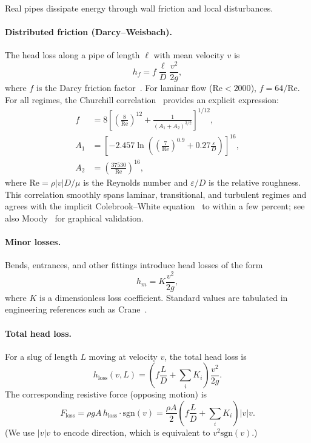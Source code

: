 \documentclass[11pt]{article}
\theoremstyle{definition}
\begin{document}
Real pipes dissipate energy through wall friction and local disturbances.

\paragraph{Distributed friction (Darcy--Weisbach).}
The head loss along a pipe of length $\ell$ with mean velocity $v$ is
\[
  h_f = f \frac{\ell}{D} \frac{v^2}{2g},
\]
where $f$ is the Darcy friction factor~\cite{white}. For laminar flow ($\text{Re} < 2000$), 
$f = 64/\text{Re}$. For all regimes, the Churchill correlation~\cite{churchill} provides 
an explicit expression:
\begin{align}
  f &= 8\left[\left(\frac{8}{\text{Re}}\right)^{12} 
       + \frac{1}{(A_1 + A_2)^{3/2}}\right]^{1/12}, \label{eq:churchill-f} \\
  A_1 &= \left[-2.457 \ln\left(\left(\frac{7}{\text{Re}}\right)^{0.9} 
         + 0.27\frac{\varepsilon}{D}\right)\right]^{16}, \label{eq:churchill-A1} \\
  A_2 &= \left(\frac{37530}{\text{Re}}\right)^{16}, \label{eq:churchill-A2}
\end{align}
where $\text{Re} = \rho |v| D / \mu$ is the Reynolds number and $\varepsilon/D$ is the 
relative roughness. This correlation smoothly spans laminar, transitional, and turbulent 
regimes and agrees with the implicit Colebrook--White equation~\cite{colebrook} to within 
a few percent; see also Moody~\cite{moody} for graphical validation.

\paragraph{Minor losses.}
Bends, entrances, and other fittings introduce head losses of the form
\[
  h_m = K \frac{v^2}{2g},
\]
where $K$ is a dimensionless loss coefficient. Standard values are tabulated in engineering 
references such as Crane~\cite{crane}.

\paragraph{Total head loss.}
For a slug of length $L$ moving at velocity $v$, the total head loss is
\begin{equation}
  h_{\text{loss}}(v, L) = \left(f \frac{L}{D} + \sum_i K_i\right) \frac{v^2}{2g}.
  \label{eq:hloss}
\end{equation}
The corresponding resistive force (opposing motion) is
\[
  F_{\text{loss}} = \rho g A\, h_{\text{loss}} \cdot \text{sgn}(v) 
                  = \frac{\rho A}{2}\left(f \frac{L}{D} + \sum_i K_i\right) |v| v.
\]
(We use $|v|v$ to encode direction, which is equivalent to $v^2 \text{sgn}(v)$.)
\end{document}
